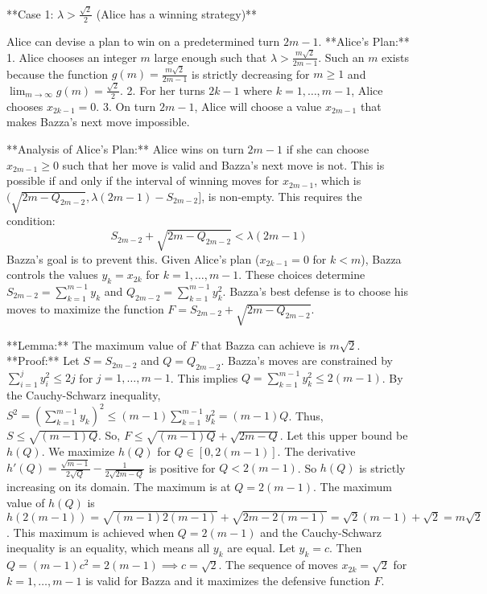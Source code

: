 \documentclass[12pt]{article}
\begin{document}
**Case 1: $\lambda > \frac{\sqrt{2}}{2}$ (Alice has a winning strategy)**

Alice can devise a plan to win on a predetermined turn $2m-1$.
**Alice's Plan:**
1.  Alice chooses an integer $m$ large enough such that $\lambda > \frac{m\sqrt{2}}{2m-1}$. Such an $m$ exists because the function $g(m) = \frac{m\sqrt{2}}{2m-1}$ is strictly decreasing for $m \ge 1$ and $\lim_{m\to\infty} g(m) = \frac{\sqrt{2}}{2}$.
2.  For her turns $2k-1$ where $k=1, \dots, m-1$, Alice chooses $x_{2k-1}=0$.
3.  On turn $2m-1$, Alice will choose a value $x_{2m-1}$ that makes Bazza's next move impossible.

**Analysis of Alice's Plan:**
Alice wins on turn $2m-1$ if she can choose $x_{2m-1} \ge 0$ such that her move is valid and Bazza's next move is not. This is possible if and only if the interval of winning moves for $x_{2m-1}$, which is $(\sqrt{2m - Q_{2m-2}}, \lambda(2m-1) - S_{2m-2}]$, is non-empty. This requires the condition:
$$S_{2m-2} + \sqrt{2m - Q_{2m-2}} < \lambda(2m-1)$$
Bazza's goal is to prevent this. Given Alice's plan ($x_{2k-1}=0$ for $k<m$), Bazza controls the values $y_k = x_{2k}$ for $k=1, \dots, m-1$. These choices determine $S_{2m-2} = \sum_{k=1}^{m-1} y_k$ and $Q_{2m-2} = \sum_{k=1}^{m-1} y_k^2$. Bazza's best defense is to choose his moves to maximize the function $F = S_{2m-2} + \sqrt{2m - Q_{2m-2}}$.

**Lemma:** The maximum value of $F$ that Bazza can achieve is $m\sqrt{2}$.
**Proof:** Let $S = S_{2m-2}$ and $Q = Q_{2m-2}$. Bazza's moves are constrained by $\sum_{i=1}^j y_i^2 \le 2j$ for $j=1, \dots, m-1$. This implies $Q = \sum_{k=1}^{m-1} y_k^2 \le 2(m-1)$.
By the Cauchy-Schwarz inequality, $S^2 = (\sum_{k=1}^{m-1} y_k)^2 \le (m-1) \sum_{k=1}^{m-1} y_k^2 = (m-1)Q$. Thus, $S \le \sqrt{(m-1)Q}$.
So, $F \le \sqrt{(m-1)Q} + \sqrt{2m-Q}$. Let this upper bound be $h(Q)$. We maximize $h(Q)$ for $Q \in [0, 2(m-1)]$.
The derivative $h'(Q) = \frac{\sqrt{m-1}}{2\sqrt{Q}} - \frac{1}{2\sqrt{2m-Q}}$ is positive for $Q < 2(m-1)$. So $h(Q)$ is strictly increasing on its domain. The maximum is at $Q=2(m-1)$.
The maximum value of $h(Q)$ is $h(2(m-1)) = \sqrt{(m-1)2(m-1)} + \sqrt{2m-2(m-1)} = \sqrt{2}(m-1) + \sqrt{2} = m\sqrt{2}$.
This maximum is achieved when $Q=2(m-1)$ and the Cauchy-Schwarz inequality is an equality, which means all $y_k$ are equal. Let $y_k=c$. Then $Q=(m-1)c^2=2(m-1) \implies c=\sqrt{2}$. The sequence of moves $x_{2k}=\sqrt{2}$ for $k=1, \dots, m-1$ is valid for Bazza and it maximizes the defensive function $F$.
\end{document}
